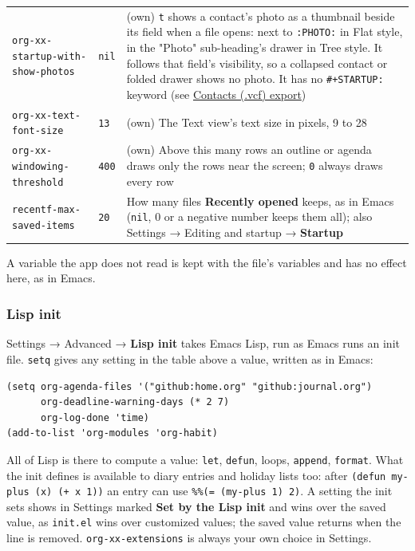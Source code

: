 \documentclass[11pt]{article}
\begin{document}
\begin{center}
\begin{tabular}{lll}
\texttt{org-xx-startup-with-show-photos} & \texttt{nil} & (own) \texttt{t} shows a contact's photo as a thumbnail beside its field when a file opens: next to \texttt{:PHOTO:} in Flat style, in the "Photo" sub-heading's drawer in Tree style. It follows that field's visibility, so a collapsed contact or folded drawer shows no photo. It has no \texttt{\#+STARTUP:} keyword (see \hyperref[sec:org9a53e51]{Contacts (.vcf) export})\\[0pt]
\texttt{org-xx-text-font-size} & \texttt{13} & (own) The Text view's text size in pixels, 9 to 28\\[0pt]
\texttt{org-xx-windowing-threshold} & \texttt{400} & (own) Above this many rows an outline or agenda draws only the rows near the screen; \texttt{0} always draws every row\\[0pt]
\texttt{recentf-max-saved-items} & \texttt{20} & How many files \textbf{Recently opened} keeps, as in Emacs (\texttt{nil}, 0 or a negative number keeps them all); also Settings → Editing and startup → \textbf{Startup}\\[0pt]
\end{tabular}
\end{center}

A variable the app does not read is kept with the file's variables and has no effect here, as in Emacs.

\subsubsection{Lisp init}
\label{sec:orgfd04167}
Settings → Advanced → \textbf{Lisp init} takes Emacs Lisp, run as Emacs runs an init file. \texttt{setq} gives any setting in the table above a value, written as in Emacs:

\begin{verbatim}
(setq org-agenda-files '("github:home.org" "github:journal.org")
      org-deadline-warning-days (* 2 7)
      org-log-done 'time)
(add-to-list 'org-modules 'org-habit)
\end{verbatim}

All of Lisp is there to compute a value: \texttt{let}, \texttt{defun}, loops, \texttt{append}, \texttt{format}. What the init defines is available to diary entries and holiday lists too: after \texttt{(defun my-plus (x) (+ x 1))} an entry can use \texttt{\%\%(= (my-plus 1) 2)}. A setting the init sets shows in Settings marked \textbf{Set by the Lisp init} and wins over the saved value, as \texttt{init.el} wins over customized values; the saved value returns when the line is removed. \texttt{org-xx-extensions} is always your own choice in Settings.
\end{document}
